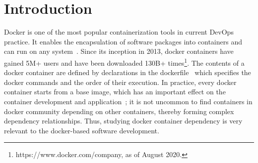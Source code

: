 \documentclass[sigconf]{acmart}
\begin{document}





\maketitle

\section{Introduction}
Docker is one of the most popular containerization tools in
current DevOps practice. It enables the encapsulation of software packages into containers and can run on any system~\cite{anderson2015docker}.
Since its inception in 2013, docker containers have gained 5M+
users and have been downloaded 130B+ times\footnote{https://www.docker.com/company, as of August 2020.}.  
The contents of a docker container are defined by declarations
in the \textsf{dockerfile}~\cite{boettiger2015introduction} which specifies the docker commands
and the order of their execution.  
In practice, every docker container starts from a base image, which has an important effect on the container development and application~\cite{zhang2018one}; it is not uncommon to find containers in docker community depending on other containers, thereby forming complex dependency relationships.  
Thus, studying docker container dependency is
very relevant to the docker-based software development.

\end{document}
